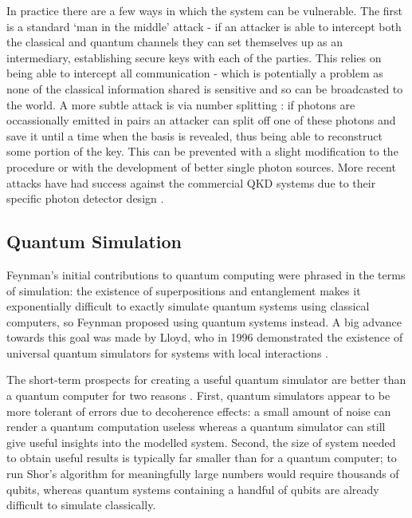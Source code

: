 In practice there are a few ways in which the system can be vulnerable. The first is a standard `man in the middle' attack - if an attacker is able to intercept both the classical and quantum channels they can set themselves up as an intermediary, establishing secure keys with each of the parties. This relies on being able to intercept all communication - which is potentially a problem as none of the classical information shared is sensitive and so can be broadcasted to the world. A more subtle attack is via number splitting \cite{qkd_number_splitting_attacks_00}: if photons are occassionally emitted in pairs an attacker can split off one of these photons and save it until a time when the basis is revealed, thus being able to reconstruct some portion of the key. This can be prevented with a slight modification to the procedure \cite{qkd_decoy_defense} or with the development of better single photon sources. More recent attacks have had success against the commercial QKD systems due to their specific photon detector design \cite{qkd_blinding_attack}.


\subsection{Quantum Simulation}

Feynman's initial contributions to quantum computing \cite{feynman_82} were phrased in the terms of simulation: the existence of superpositions and entanglement makes it exponentially difficult to exactly simulate quantum systems using classical computers, so Feynman proposed using quantum systems instead. A big advance towards this goal was made by Lloyd, who in 1996 demonstrated the existence of universal quantum simulators for systems with local interactions \cite{lloyd_universal_simulators}.

The short-term prospects for creating a useful quantum simulator are better than a quantum computer for two reasons \cite{simulation_ion_review}. First, quantum simulators appear to be more tolerant of errors due to decoherence effects: a small amount of noise can render a quantum computation useless whereas a quantum simulator can still give useful insights into the modelled system. Second, the size of system needed to obtain useful results is typically far smaller than for a quantum computer; to run Shor's algorithm for meaningfully large numbers would require thousands of qubits, whereas quantum systems containing a handful of qubits are already difficult to simulate classically.

